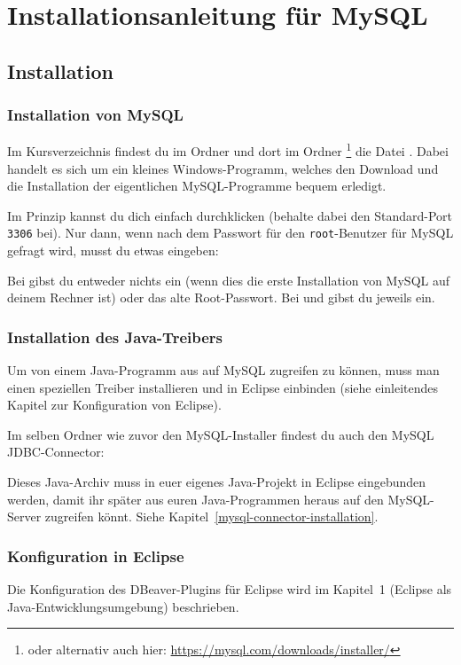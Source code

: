 \section{Installationsanleitung für MySQL}

\subsection{Installation}

\subsubsection{Installation von MySQL}

Im Kursverzeichnis findest du im Ordner  und dort
im Ordner \linebreak {}\footnote{oder alternativ auch hier:
\url{https://mysql.com/downloads/installer/}} die Datei
. Dabei handelt es sich um
ein kleines Windows-Programm, welches den Download und die Installation der
eigentlichen MySQL-Programme bequem erledigt.

Im Prinzip kannst du dich einfach durchklicken (behalte dabei den Standard-Port
\texttt{3306} bei). Nur dann, wenn nach dem Passwort für den
\lstinline|root|-Benutzer für MySQL gefragt wird, musst du etwas eingeben:

Bei  gibst du entweder nichts ein (wenn dies die
erste Installation von MySQL auf deinem Rechner ist) oder das alte
Root-Passwort. Bei  und  gibst
du jeweils  ein.


\subsubsection{Installation des Java-Treibers}

Um von einem Java-Programm aus auf MySQL zugreifen zu können, muss man einen
speziellen Treiber installieren und in Eclipse einbinden (siehe einleitendes
Kapitel zur Konfiguration von Eclipse).

Im selben Ordner wie zuvor den MySQL-Installer findest du auch den MySQL
JDBC-Connector:


Dieses Java-Archiv muss in euer eigenes Java-Projekt in Eclipse eingebunden
werden, damit ihr später aus euren Java-Programmen heraus auf den MySQL-Server
zugreifen könnt. Siehe Kapitel~\ref{mysql-connector-installation}.


\subsubsection{Konfiguration in Eclipse}

Die Konfiguration des DBeaver-Plugins für Eclipse wird im Kapitel~1
(Eclipse als Java-Entwicklungsumgebung) beschrieben.
